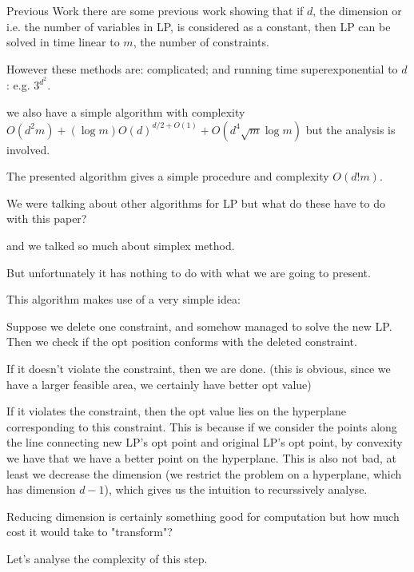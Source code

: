 \documentclass{beamer}
\begin{document}
\begin{frame}{Previous Work}
    there are some previous work showing that
    if $d$, the dimension or i.e. the number of variables in LP, is considered as a constant,
    then LP can be solved in time linear to $m$, the number of constraints.

    However these methods are: complicated; and running time superexponential to $d$: e.g. $3^{d^2}$.

    we also have a simple algorithm with complexity $O(d^2m) + (\log m)O(d)^{d/2 + O(1)} + O(d^4 \sqrt{m} \log m)$
    but the analysis is involved.

    The presented algorithm gives a simple procedure and complexity $O(d!m)$.
    
\end{frame}

\begin{frame}
    We were talking about other algorithms for LP but what do these have to do with this paper?

    and we talked so much about simplex method.

    But unfortunately it has nothing to do with what we are going to present.

    This algorithm makes use of a very simple idea:

    Suppose we delete one constraint, and somehow managed to solve the new LP. 
    Then we check if the opt position conforms with the deleted constraint.

    If it doesn't violate the constraint, then we are done. (this is obvious, 
    since we have a larger feasible area, we certainly have better opt value)

    If it violates the constraint, then the opt value lies on the hyperplane
    corresponding to this constraint.
    This is because if we consider the points along the line connecting 
    new LP's opt point and original LP's opt point, by convexity we have that
    we have a better point on the hyperplane.
    This is also not bad, at least we decrease the dimension (we restrict the problem
    on a hyperplane, which has dimension $d - 1$), which gives us the intuition to recurssively analyse.

    Reducing dimension is certainly something good for computation but how much cost it would take to "transform"?

    Let's analyse the complexity of this step.


\end{frame}
\end{document}
